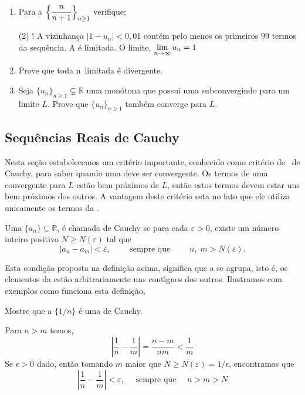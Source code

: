 \begin{enumerate}[label=\rm{(\arabic*)},ref=\rm{(\arabic*)}]
\item Para a \seq $\Bigl\{\displaystyle{\frac{n}{n+1}}\Bigr\}_{n\geq1}$
verifique;
\begin{tasks}[label=\rm{(\alph*)},item-indent=4em,label-width=4ex,ref=\rm{(\alph*)}](2)
\task!  A vizinhan\c ca $|1-u_n|<0,01$ cont\'em pelo menos os primeiros $99$ termos da sequ\^{e}ncia.
\task  A \seq \'e limitada.
\task  O limite, $\displaystyle{\lim_{n\to\infty}u_n=1}$
\end{tasks}
\item Prove que toda \seq  n\ao\ limitada \'e divergente.
\item Seja $\{u_n\}_{n\geq1}\subsetneq \mathbb{R}$ uma \seq  mon\'otona que possui uma
sub\seq convergindo para um limite $L$. Prove que
$\{u_n\}_{n\geq1}$ tamb\'em converge para $L$.
\end{enumerate}

\subsection{Sequ\^{e}ncias Reais de Cauchy}
Nesta se\c{c}\~{a}o estabelecemos um crit\'{e}rio importante, conhecido como
crit\'{e}rio de \conver\ de Cauchy, para saber quando uma \seq deve ser
convergente. Os termos de uma \seq convergente para $L$ est\~{a}o bem
pr\'{o}ximos de $L$, ent\~{a}o estos termos devem estar uns bem pr\'{o}ximos dos
outros. A vantagem deste crit\'{e}rio esta no fato que ele utiliza
unicamente os termos da \seq.

\begin{defi}
  Uma \seq $\{a_n\}\subsetneq \mathbb{R}$, \'{e} chamada de Cauchy se para cada $\varepsilon>0$, existe
  um n\'{u}mero inteiro positivo $N\geq N(\varepsilon)$ tal que
\begin{equation*}
  |a_n-a_m|<\varepsilon,\qquad \text{ sempre que }\qquad n,\; m
  >N(\varepsilon).
\end{equation*}
\end{defi}

Esta condi\c{c}\~{a}o proposta na defini\c{c}\~{a}o acima, significa que a \seq se
agrupa, isto \'{e}, os elementos da \seq est\~{a}o arbitrariamente uns
cont\'{\i}guos dos outros. Ilustramos com exemplos como funciona esta
defini\c{c}\~{a}o,

\begin{exer}
Mostre que a \seq $\{1/n\}$ \'{e} uma \seq de Cauchy.
\end{exer}

\solo Para $n>m$ temos,
\begin{equation*}
  \left|\frac{1}{n}-\frac{1}{m} \right|=\frac{n-m}{nm}<\frac{1}{m}
\end{equation*}
 Se $\epsilon>0$ dado, ent\~{a}o tomando $m$ maior que $N\geq N(\varepsilon)=1/\epsilon$,
 encontramos que
\begin{equation*}
\left|\frac{1}{n}-\frac{1}{m} \right|<\varepsilon,\quad \text{ sempre que }\quad n>m>N
\end{equation*}

